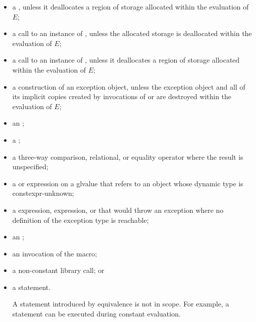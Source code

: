 \begin{itemize}
\item
a ,
unless it deallocates a region of storage
allocated within the evaluation of $E$;

\item
a call to an instance of
,
unless the allocated storage is deallocated within the evaluation of $E$;

\item
a call to an instance of
,
unless it deallocates a region of storage
allocated within the evaluation of $E$;

\item
a construction of an exception object,
unless the exception object and
all of its implicit copies created by invocations of
 or 
are destroyed within the evaluation of $E$;

\item
an ;

\item
a ;

\item
a three-way comparison,
relational, or equality
operator where the result is unspecified;

\item
a  or
 expression
on a glvalue that refers to an object
whose dynamic type is constexpr-unknown;

\item
a  expression,
 expression, or
that would throw an exception
where no definition of the exception type is reachable;

\item
an ;

\item
an invocation of the  macro;

\item
a non-constant library call;
or

\item
a  statement.
\begin{note}
A  statement introduced by equivalence
is not in scope.
For example, a  statement
can be executed during constant evaluation.
\end{note}
\end{itemize}

